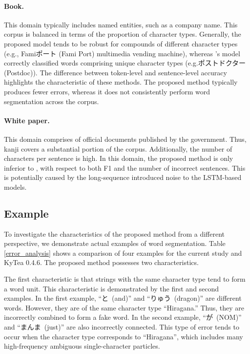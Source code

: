 \documentclass[11pt]{article}
\begin{document}
\paragraph{Book.}  This domain typically includes named entities, such as
a company name. This corpus is balanced in terms of the proportion of
character types.
Generally, the proposed model tends to be robust for compounds of different
character types (e.g., Famiポート (Fami Port)
multimedia vending machine), whereas
's model correctly classified
words comprising unique character types (e.g.ポストドクター (Postdoc)).
The difference between token-level and sentence-level accuracy
highlights the characteristic of these methods. The proposed method typically
produces fewer errors, whereas it does not consistently perform word
segmentation across the corpus.

\paragraph{White paper.} This domain comprises of official documents published
by the government. Thus, kanji covers a substantial portion of the corpus.
Additionally, the number of characters per sentence is high. In this domain,
the proposed method is only inferior to
, with respect to both F1 and the
number of incorrect sentences. This is potentially caused by the long-sequence
introduced noise to the LSTM-based models.


\subsection{Example}
To investigate the characteristics of the proposed method from a
different perspective, we demonstrate actual examples of word segmentation.
Table \ref{error_analysis} shows a comparison of four examples for the current
study and KyTea 0.4.6.
The proposed method possesses two characteristics.

The first characteristic is that strings with the same character type tend to
form a word unit. This characteristic is demonstrated by the first and second
examples.
In the first example, \mbox{``と (and)''} and
\mbox{``りゅう (dragon)''} are different words.
However, they are of the same character type ``Hiragana.'' Thus, they are
incorrectly combined to form a fake word. In the second example,
\mbox{``が (NOM)'' } and \mbox{``まんま (just)''} are also incorrectly
connected. This type of error tends to occur when the character type
corresponds to \mbox{``Hiragana''}, which includes many high-frequency
ambiguous single-character particles.
 
\end{document}
